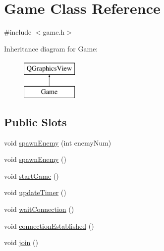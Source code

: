 \hypertarget{class_game}{}\section{Game Class Reference}
\label{class_game}


{\ttfamily \#include $<$game.\+h$>$}

Inheritance diagram for Game\+:\begin{figure}[H]
\begin{center}
\leavevmode
\includegraphics[height=2.000000cm]{class_game}
\end{center}
\end{figure}
\subsection*{Public Slots}
\begin{DoxyCompactItemize}
\item 
void \hyperlink{class_game_a2c06f08e42cb8ef918596edd11ee00d1}{spawn\+Enemy} (int enemy\+Num)
\item 
void \hyperlink{class_game_ad7a4181414089729ddea00c053f822c4}{spawn\+Enemy} ()
\item 
void \hyperlink{class_game_ae8638ccdb0ef3bf39a6affa30aa1258f}{start\+Game} ()
\item 
void \hyperlink{class_game_a89ee6bc4da77b30b9ab09d6148944cda}{update\+Timer} ()
\item 
void \hyperlink{class_game_a771253a0edc9a31ff64352eb0a4367cb}{wait\+Connection} ()
\item 
void \hyperlink{class_game_a480aa57ccdd02118f7716b4870a2b47c}{connection\+Established} ()
\item 
void \hyperlink{class_game_ae95e1d94393a35f3d4edda97ebfc3358}{join} ()
\end{DoxyCompactItemize}
